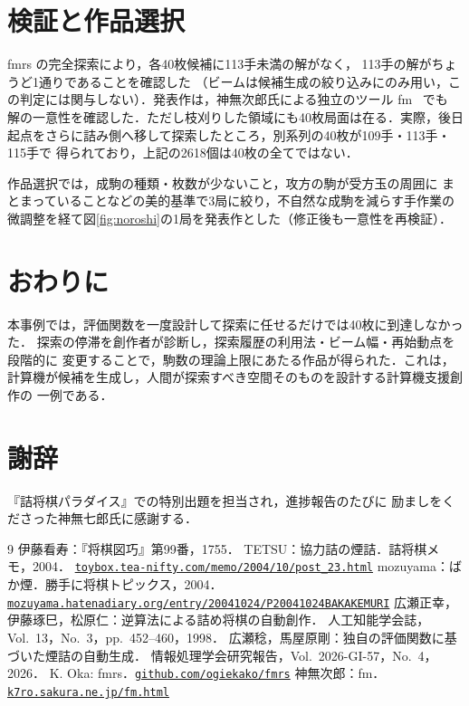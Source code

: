 \documentclass[10pt,a4paper,twocolumn]{ltjsarticle}
\newcommand{\weburl}[1]{\href{https://#1}{\nolinkurl{#1}}}
\begin{document}
\section{検証と作品選択}

fmrs の完全探索により，各40枚候補に113手未満の解がなく，
113手の解がちょうど1通りであることを確認した
（ビームは候補生成の絞り込みにのみ用い，この判定には関与しない）．発表作は，神無次郎氏による独立のツール fm~\cite{fm} でも
解の一意性を確認した．ただし枝刈りした領域にも40枚局面は在る．実際，後日
起点をさらに詰み側へ移して探索したところ，別系列の40枚が109手・113手・115手で
得られており，上記の2618個は40枚の全てではない．

作品選択では，成駒の種類・枚数が少ないこと，攻方の駒が受方玉の周囲に
まとまっていることなどの美的基準で3局に絞り，不自然な成駒を減らす手作業の
微調整を経て図\ref{fig:noroshi}の1局を発表作とした（修正後も一意性を再検証）．

\section{おわりに}

本事例では，評価関数を一度設計して探索に任せるだけでは40枚に到達しなかった．
探索の停滞を創作者が診断し，探索履歴の利用法・ビーム幅・再始動点を段階的に
変更することで，駒数の理論上限にあたる作品が得られた．これは，
計算機が候補を生成し，人間が探索すべき空間そのものを設計する計算機支援創作の
一例である．

\section*{謝辞}

『詰将棋パラダイス』での特別出題を担当され，進捗報告のたびに
励ましをくださった神無七郎氏に感謝する．

\vspace{-4mm}
\begin{thebibliography}{9}
\footnotesize
\setlength{\itemsep}{0pt}
\setlength{\parsep}{0pt}
\setlength{\topsep}{2pt}
 伊藤看寿：『将棋図巧』第99番，1755．
 TETSU：協力詰の煙詰．詰将棋メモ，2004．
\weburl{toybox.tea-nifty.com/memo/2004/10/post_23.html}
 mozuyama：ばか煙．勝手に将棋トピックス，2004．
\weburl{mozuyama.hatenadiary.org/entry/20041024/P20041024BAKAKEMURI}
 広瀬正幸，伊藤琢巳，松原仁：逆算法による詰め将棋の自動創作．
人工知能学会誌，Vol.~13，No.~3，pp.~452--460，1998．
 広瀬稔，馬屋原剛：独自の評価関数に基づいた煙詰の自動生成．
情報処理学会研究報告，Vol.~2026-GI-57，No.~4，2026．
 K. Oka: fmrs．\weburl{github.com/ogiekako/fmrs}
 神無次郎：fm．\weburl{k7ro.sakura.ne.jp/fm.html}
\end{thebibliography}
\end{document}
